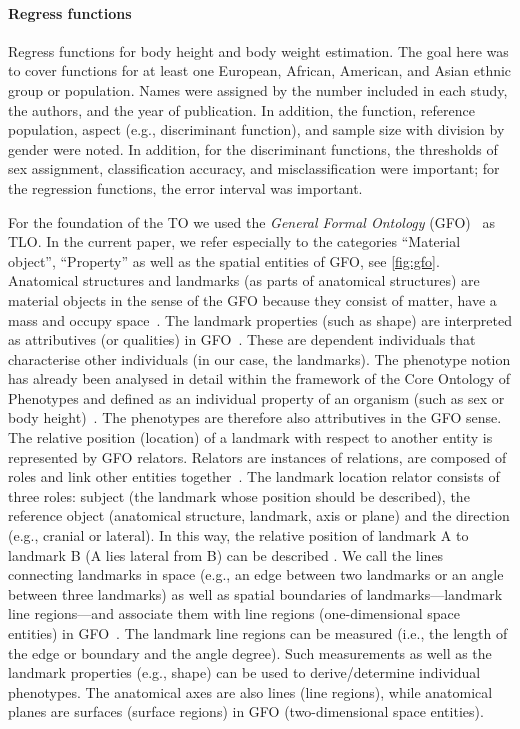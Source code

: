 \documentclass[sw]{iosart2x}
\begin{document}
\paragraph{Regress functions}
Regress functions for body height and body weight estimation.
The goal here was to cover functions for at least one European, African, American, and Asian ethnic group or population.
Names were assigned by the number included in each study, the authors, and the year of publication.
In addition, the function, reference population, aspect (e.g., discriminant function), and sample size with division by gender were noted.
In addition, for the discriminant functions, the thresholds of sex assignment, classification accuracy, and misclassification were important; for the regression functions, the error interval was important.

For the foundation of the TO we used the \emph{General Formal Ontology} (GFO)~\citep{gfo} as TLO.
In the current paper, we refer especially to the categories \enquote{Material object}, \enquote{Property} as well as the spatial entities of GFO, see \cref{fig:gfo}.
Anatomical structures and landmarks (as parts of anatomical structures) are material objects in the sense of the GFO because they consist of matter, have a mass and occupy space~\citep{gfospace}.
The landmark properties (such as shape) are interpreted as attributives (or qualities) in GFO~\citep{gfoarchitecture}.
These are dependent individuals that characterise other individuals (in our case, the landmarks).
The phenotype notion has already been analysed in detail within the framework of the Core Ontology of Phenotypes and defined as an individual property of an organism (such as sex or body height)~\citep{ontologicalrepresentation}.
The phenotypes are therefore also attributives in the GFO sense.
The relative position (location) of a landmark with respect to another entity is represented by GFO relators.
Relators are instances of relations, are composed of roles and link other entities together~\citep{gfocategory}.
The landmark location relator consists of three roles: subject (the landmark whose position should be described), the reference object (anatomical structure, landmark, axis or plane) and the direction (e.g., cranial or lateral).
In this way, the relative position of landmark A to landmark B (A lies lateral from B) can be described .
We call the lines connecting landmarks in space (e.g., an edge between two landmarks or an angle between three landmarks) as well as spatial boundaries of
landmarks---landmark line regions---and associate them with line regions (one-dimensional space entities) in GFO~\citep{gfospace}.
The landmark line regions can be measured (i.e., the length of the edge or boundary and the angle degree).
Such measurements as well as the landmark properties (e.g., shape) can be used to derive/determine individual phenotypes.
The anatomical axes are also lines (line regions), while anatomical planes are surfaces (surface regions) in GFO (two-dimensional space entities).
\end{document}
